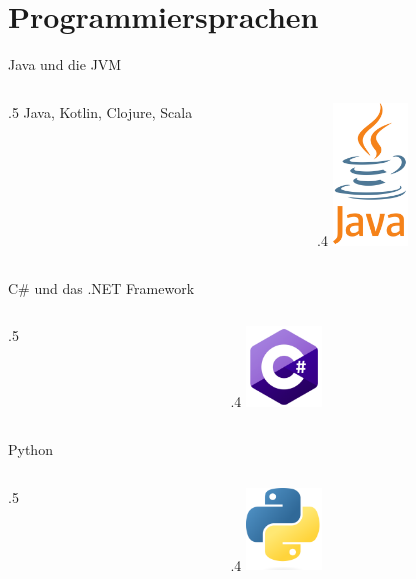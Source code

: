 \section{Programmiersprachen}


\begin{frame}{Java und die JVM}
    \begin{columns}
        \begin{column}{.5\framewidth}
            Java, Kotlin, Clojure, Scala
        \end{column}
        \begin{column}{.4\framewidth}
            \includegraphics[width=2cm]{resources/logos/java}
        \end{column}
    \end{columns}
\end{frame}

\begin{frame}{C\# und das .NET Framework}
    \begin{columns}
        \begin{column}{.5\framewidth}

        \end{column}
        \begin{column}{.4\framewidth}
            \includegraphics[width=2cm]{resources/logos/csharp}
        \end{column}
    \end{columns}
\end{frame}

\begin{frame}{Python}
    \begin{columns}
        \begin{column}{.5\framewidth}

        \end{column}
        \begin{column}{.4\framewidth}
            \includegraphics[width=2cm]{resources/logos/python}
        \end{column}
    \end{columns}
\end{frame}
